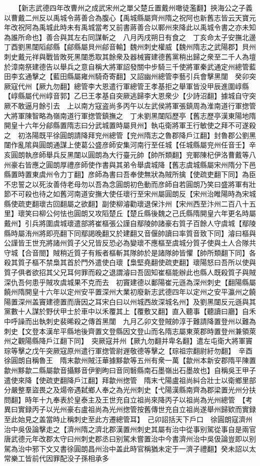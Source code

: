 　　【新志武德四年改曹州之成武宋州之單父楚丘置戴州噉徒濫翻】挾海公之子義以曹戴二州反以禹城令蔣善合為腹心【禹城縣屬齊州隋之祝阿也新舊志皆云天寶元年改祝阿為禹城此時未有禹城當考又前書蔣善合以鄆州來降此以禹城令書之亦未知為誰所命也】善合與其左右同謀斬之　八月丙戌朔日有食之　丁亥命太子安撫北邊　丁酉劉黑闥䧟鄃縣【鄃縣屬貝州鄃音輸】魏州刺史權威【魏州隋志之武陽郡】貝州刺史戴元祥與戰皆敗死黑闥悉取其餘衆及器械竇建德舊黨稍出歸之衆至二千人為壇於漳南祭建德告以舉兵之意自稱大將軍詔發關中步騎三千使將軍秦武通定州總管藍田李玄通擊之【藍田縣屬雍州騎奇寄翻】又詔幽州總管李藝引兵會擊黑闥　癸卯突厥寇代州【厥九勿翻】總管李大恩遣行軍總管王孝基拒之舉軍皆没甲辰進圍崞縣【崞縣屬代州崞音郭】乙巳王孝基自突厥逃歸李大恩衆少【少詩沼翻】據城自守突厥不敢逼月餘引去　上以南方寇盗尚多丙午以左武侯將軍張鎮周為淮南道行軍揔管大將軍陳智略為嶺南道行軍揔管鎮撫之　丁未劉黑闥䧟歷亭【舊志歷亭漢東陽地隋開皇十六年分鄃縣置隋志曰分武城置時屬貝州】執屯衛將軍王行敏使之拜不可遂殺之　初洛陽既平徐圓朗請降拜兖州總管【兖州隋志之魯郡降戶江翻】封魯郡公劉黑闥作亂隂與圓朗通謀上使葛公盛彦師安集河南行至任城【任城縣屬兖州任音壬】辛亥圓朗執彦師舉兵反黑闥以圓朗為大行臺元帥【帥所類翻】兖鄆陳杞伊洛曹戴等八州豪右皆應之圓朗厚禮彦師使作書與其弟令舉虞城降【舊志虞城縣屬宋州隋分下邑縣置時置東虞州令力丁翻】彦師為書曰吾奉使無狀為賊所擒【使疏吏翻下同】為臣不忠誓之以死汝善侍老母勿以吾為念圓朗初色動而彦師自若圓朗乃笑曰盛將軍有壯節不可殺也待之如舊河南道安撫大使任瓌行至宋州屬圓朗反【宋州治睢陽時為宋城縣使疏吏翻瓌古回翻屬之欲翻】副使柳濬勸瓌退保汴州【宋州西至汴州二百八十五里】瓌笑曰柳公何怯也圓朗又攻䧟楚丘【楚丘縣後魏之己氏縣隋開皇六年更名時屬戴州】引兵將圍虞城瓌遣部將崔樞張公謹自鄢陵帥諸豪右質子百餘人守虞城【鄢陵縣時屬洧州將即亮翻下同鄢謁晚翻又於建翻又音偃帥讀曰率質音致下同】濬曰樞與公謹皆王世充將諸州質子父兄皆反恐必為變瓌不應樞至虞城分質子使與土人合隊共守城【合音閤】賊稍近質子有叛者樞斬其隊帥於是諸隊帥皆懼【帥所類翻下同】各殺其質子樞不禁梟其首於門外遣使白瓌【梟堅堯翻使疏吏翻】瓌陽怒曰吾所以使與質子俱者欲招其父兄耳何罪而殺之退謂濬曰吾固知崔樞能辦此也縣人既殺質子與賊深仇吾何患乎賊攻虞城果不克而去　初竇建德以鄱陽崔元遜為深州刺史【翻陽縣屬饒州隋開皇十六年以定州安平置深州大業初廢新志武德四年以定州之安平瀛州之饒陽置深州盖竇建德置而唐因之耳宋白曰以州城西故深城名州】及劉黑闥反元遜與其黨數十人謀於野伏甲士於車中以禾覆其上【覆敷又翻】直入聽事【聽讀曰廳】自禾中呼譟而出執刺史裴晞殺之傳首黑闥　九月乙卯文登賊帥淳于難請降置登州以難為刺史【文登本漢牟平縣地後齊置文登縣因文登山而名隋志屬東萊郡時置登州兼領萊州之觀陽縣降戶江翻下同】　突厥寇并州【厥九勿翻并卑名翻】遣左屯衛大將軍竇琮等擊之戊午突厥寇原州遣行軍揔管尉遟敬德等擊之【琮祖宗翻尉紆勿翻】　辛酉徐圓朗自稱魯王　隋末歙州賊汪華據黟歙等五州有衆一萬【歙州本新安郡隋平陳置歙州黟歙二縣屬歙音攝黟音伊劉昫曰音同䃜縣南石墨嶺出石墨故也】自稱吳王甲子遣使來降【使疏吏翻降戶江翻】拜歙州揔管　隋末弋陽盧祖尚糾合壯士以衛鄉里部分嚴整羣盜畏之及煬帝遇弑鄉人奉之為光州刺史【弋陽漢縣南齊為郡梁置光州分扶問翻】時年十九奉表於皇泰主及王世充自立祖尚來降丙子以祖尚為光州總管　【考異曰實録丙子以光州豪右盧祖尚為光州揔管按舊傳世充自立祖尚遂舉州歸欵而實録至此始見之盖當時止稱刺史至此方遷總管耳】　己卯詔括天下戶口　徐圓朗寇濟州治中吳伋論擊走之【濟州隋之濟北郡漢置州刺史其屬有治中從事别駕從事自是兩官唐武德元年改郡太守曰州刺史郡丞曰别駕未嘗置治中今書濟州治中吳伋論豈即以别駕為治中邪下文又書徐圓朗昌州治中盖此時官稱猶未定于一濟子禮翻】癸未詔以太常樂工皆前代因罪配没子孫相承多

